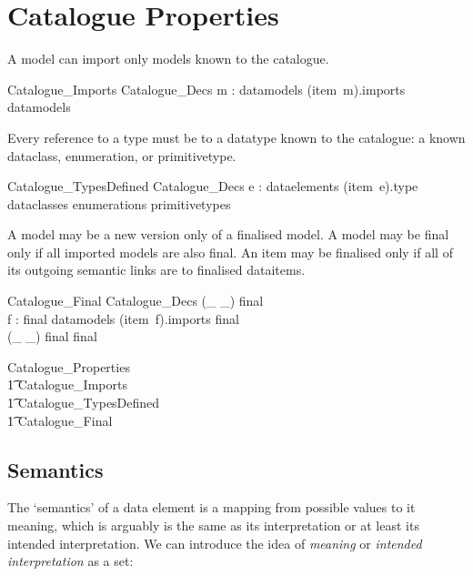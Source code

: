\documentclass[a4paper,twoside]{article}
\def\refines{\mathrel{refines}}
\def\newVersionOf{\mathrel{newVersionOf}}
\begin{document}
\section{Catalogue Properties}

A model can import only models known to the catalogue.

\begin{schema}{Catalogue\_Imports}
	Catalogue\_Decs 
	\where
	\forall m : datamodels \spot (item~m).imports\\ \subseteq datamodels
\end{schema}

Every reference to a type must be to a datatype known to the catalogue: a known dataclass, enumeration, or primitivetype. 

\begin{schema}{Catalogue\_TypesDefined}
	Catalogue\_Decs
	\where
	\forall e : dataelements \spot (item~e).type \in \\dataclasses \cup enumerations \cup primitivetypes 
\end{schema}

A model may be a new version only of a finalised model.  A model may be final only if all imported models are also final.  An item may be finalised only if all of its outgoing semantic links are to finalised dataitems.

\begin{schema}{Catalogue\_Final}
	Catalogue\_Decs
	\where
	\ran (\_ \newVersionOf \_) \subseteq final \\
	\forall f : final \cap datamodels \spot (item~f).imports \subseteq final \\
	(\_ \refines \_) \limg final \rimg \subseteq final 
\end{schema}

\begin{zed}
	Catalogue\_Properties  \\ \t1
	Catalogue\_Imports \land {} \\ \t1 
	Catalogue\_TypesDefined \land {} \\ \t1
	Catalogue\_Final 
\end{zed}

\subsection{Semantics}

The `semantics' of a data element is a mapping from possible values to it meaning, which is arguably is the same as its interpretation or at least its intended interpretation.  We can introduce the idea of \emph{meaning} or \emph{intended interpretation} as a set:
\end{document}
